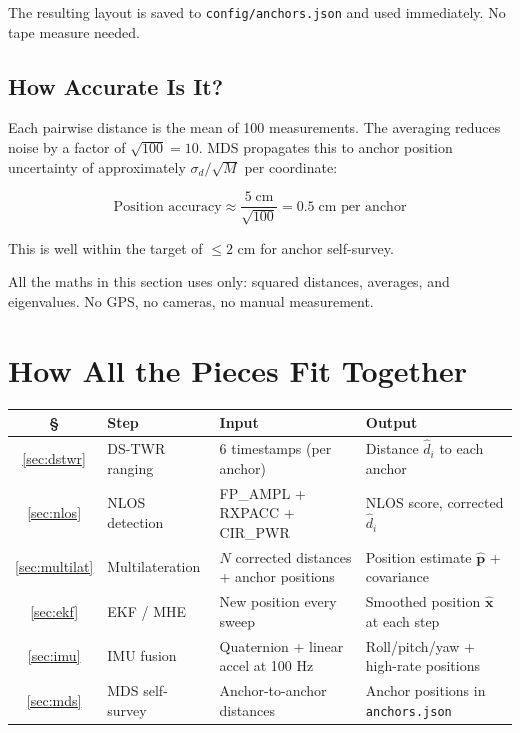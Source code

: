 \documentclass[11pt,a4paper]{article}
\newcommand{\vect}[1]{\bm{#1}}
\begin{document}
The resulting layout is saved to \texttt{config/anchors.json} and used immediately. No tape measure needed.

\subsection{How Accurate Is It?}

Each pairwise distance is the mean of 100 measurements. The averaging reduces noise by a factor of $\sqrt{100}=10$. MDS propagates this to anchor position uncertainty of approximately $\sigma_d/\sqrt{M}$ per coordinate:

\[
\text{Position accuracy} \approx \frac{5\;\text{cm}}{\sqrt{100}} = 0.5\;\text{cm per anchor}
\]

This is well within the target of $\leq 2$ cm for anchor self-survey.

\begin{takeaway}
All the maths in this section uses only: squared distances, averages, and eigenvalues. No GPS, no cameras, no manual measurement.
\end{takeaway}

\section{How All the Pieces Fit Together}

\begin{center}
\renewcommand{\arraystretch}{1.4}
\begin{tabular}{clll}
\toprule
\textbf{\S} & \textbf{Step} & \textbf{Input} & \textbf{Output} \\
\midrule
\ref{sec:dstwr} & DS-TWR ranging & 6 timestamps (per anchor) & Distance $\hat{d}_i$ to each anchor \\
\ref{sec:nlos}  & NLOS detection & FP\_AMPL + RXPACC + CIR\_PWR & NLOS score, corrected $\hat{d}_i$ \\
\ref{sec:multilat} & Multilateration & $N$ corrected distances + anchor positions & Position estimate $\hat{\vect{p}}$ + covariance \\
\ref{sec:ekf}   & EKF / MHE & New position every sweep & Smoothed position $\hat{\vect{x}}$ at each step \\
\ref{sec:imu}   & IMU fusion & Quaternion + linear accel at 100 Hz & Roll/pitch/yaw + high-rate positions \\
\ref{sec:mds}   & MDS self-survey & Anchor-to-anchor distances & Anchor positions in \texttt{anchors.json} \\
\bottomrule
\end{tabular}
\end{center}
\end{document}
